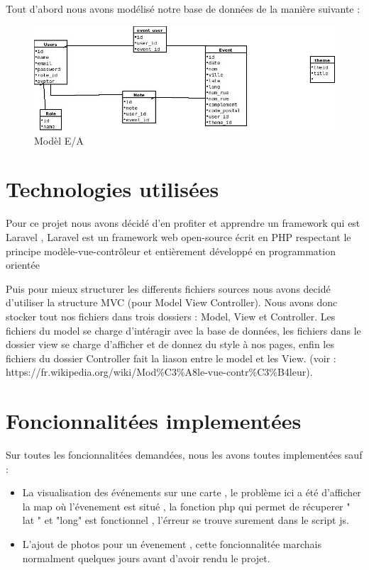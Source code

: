 \documentclass[oneside,11pt,a4paper]{article}
\begin{document}
Tout d'abord nous avons modélisé notre base de données de la manière suivante : 

\begin{figure}[h]
  \centering
  \includegraphics[width=1\textwidth]{Diagramme1.jpg}
  \caption{Modèl E/A}
\end{figure}
  
\section{Technologies utilisées}

Pour ce projet nous avons décidé d'en profiter et apprendre un framework qui est Laravel , Laravel est un framework web open-source écrit en PHP respectant le principe modèle-vue-contrôleur et entièrement développé en programmation orientée

Puis pour mieux structurer les differents fichiers sources nous avons decidé d'utiliser la structure MVC (pour Model View Controller). Nous avons donc stocker tout nos fichiers dans trois dossiers : Model, View et Controller. Les fichiers du model se charge d'intéragir avec la base de données, les fichiers dans le dossier view se charge d'afficher et de donnez du style à nos pages, enfin les fichiers du dossier Controller fait la liason entre le model et les View. (voir : https://fr.wikipedia.org/wiki/Mod\%C3\%A8le-vue-contr\%C3\%B4leur).
\section{Foncionnalitées implementées}

Sur toutes les foncionnalitées demandées, nous les avons toutes implementées sauf :

\begin{itemize}
  \item La visualisation des événements sur une carte , le problème ici a été d'afficher la map où l'évenement est situé , la fonction php qui permet de récuperer " lat " et "long" est fonctionnel , l'érreur se trouve surement dans le script js.

  \item L'ajout de photos pour un évenement , cette foncionnalitée marchais normalment quelques jours avant d'avoir rendu le projet.
\end{itemize}
\end{document}
